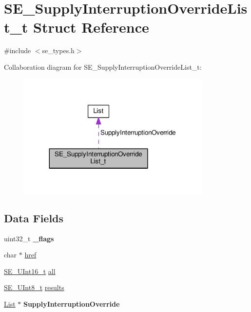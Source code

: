 \hypertarget{structSE__SupplyInterruptionOverrideList__t}{}\section{S\+E\+\_\+\+Supply\+Interruption\+Override\+List\+\_\+t Struct Reference}
\label{structSE__SupplyInterruptionOverrideList__t}


{\ttfamily \#include $<$se\+\_\+types.\+h$>$}



Collaboration diagram for S\+E\+\_\+\+Supply\+Interruption\+Override\+List\+\_\+t\+:\nopagebreak
\begin{figure}[H]
\begin{center}
\leavevmode
\includegraphics[width=275pt]{structSE__SupplyInterruptionOverrideList__t__coll__graph}
\end{center}
\end{figure}
\subsection*{Data Fields}
\begin{DoxyCompactItemize}
\item 
uint32\+\_\+t {\bfseries \+\_\+flags}
\item 
char $\ast$ \hyperlink{group__SupplyInterruptionOverrideList_gad15eb8acad90ef62beb20d8dff40fc29}{href}
\item 
\hyperlink{group__UInt16_gac68d541f189538bfd30cfaa712d20d29}{S\+E\+\_\+\+U\+Int16\+\_\+t} \hyperlink{group__SupplyInterruptionOverrideList_ga7b7aae197507ee1243fb86a95a7da717}{all}
\item 
\hyperlink{group__UInt8_gaf7c365a1acfe204e3a67c16ed44572f5}{S\+E\+\_\+\+U\+Int8\+\_\+t} \hyperlink{group__SupplyInterruptionOverrideList_gad45b841730b071b050986cae31535380}{results}
\item 
\hyperlink{structList}{List} $\ast$ {\bfseries Supply\+Interruption\+Override}
\end{DoxyCompactItemize}


